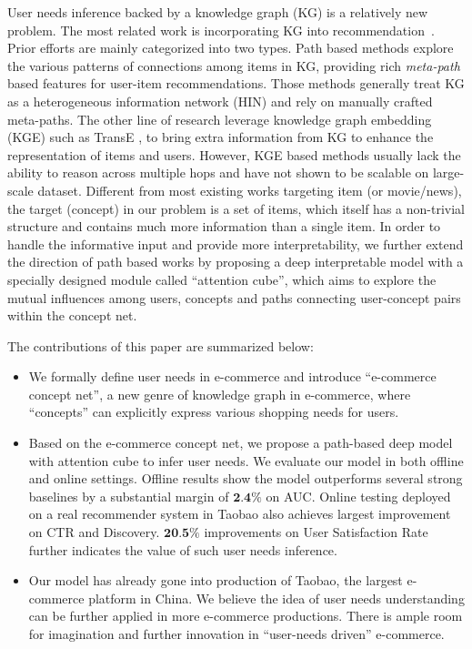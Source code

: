 User needs inference backed by a knowledge graph (KG) is a relatively new problem. 
The most related work is incorporating KG into recommendation~\cite{zhang2016collaborative,sun2018recurrent,huang2018improving}.
Prior efforts are mainly categorized into two types. 
Path based methods \cite{zhao2017meta,hu2018leveraging} explore the various patterns of connections among items in KG, providing rich \textit{meta-path} based features for
user-item recommendations.
Those methods generally treat KG as a heterogeneous information network (HIN) and rely on manually crafted meta-paths.
The other line of research \cite{wang2018dkn,huang2018improving} leverage knowledge graph embedding (KGE) such as TransE \cite{bordes2013translating}, to bring extra information from KG to enhance the representation of items and users. 
However, KGE based methods usually lack the ability to reason across multiple 
hops and have not shown to be scalable on large-scale dataset.
Different from most existing works targeting item (or movie/news), 
the target (concept) in our problem is a set of items, which itself has a non-trivial structure and contains much more information than a single item.
In order to handle the informative input and provide more interpretability,
we further extend the direction of path based works
by proposing a deep interpretable model with a specially designed module 
called ``attention cube'', which
aims to explore the mutual influences among users, concepts and paths 
connecting user-concept pairs within the concept net.


The contributions of this paper are summarized below:
\begin{itemize}
	\itemsep0em
	\item We formally define user needs in e-commerce and introduce ``e-commerce concept net'', a new genre of knowledge graph in e-commerce, where ``concepts'' can explicitly express various shopping needs for users. 
	\item Based on the e-commerce concept net,
	we propose a path-based deep model with attention cube to infer user needs. 
	We evaluate our model in both offline and online settings.
	Offline results show the model outperforms 
	several strong baselines by a substantial margin of $\textbf{2.4\%}$ on AUC.
	Online testing deployed on a real recommender system in Taobao also achieves largest improvement on CTR and Discovery. $\textbf{20.5\%}$ improvements on User Satisfaction Rate further indicates the value of such user needs inference.
	\item Our model has already gone into production of Taobao, the largest e-commerce platform in China. We believe the idea of user needs understanding can be further applied in more e-commerce productions.
	There is ample room for imagination and further innovation in ``user-needs driven'' e-commerce.
\end{itemize}


